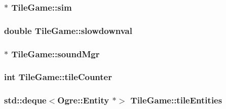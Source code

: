 \hypertarget{classTileGame_a2225cb84303358e59c6093b8a999e085}{
\subsubsection[{sim}]{$\ast$ Tile\-Game\-::sim\hspace{0.3cm}{\ttfamily [protected]}}}\label{classTileGame_a2225cb84303358e59c6093b8a999e085}
\hypertarget{classTileGame_a8b95ee0f509c6e7b170f392d755d2e59}{
\subsubsection[{slowdownval}]{\setlength{\rightskip}{0pt plus 5cm}double Tile\-Game\-::slowdownval\hspace{0.3cm}{\ttfamily [protected]}}}\label{classTileGame_a8b95ee0f509c6e7b170f392d755d2e59}
\hypertarget{classTileGame_aca4c76a09f77a7f55ae0c4396f72aefc}{
\subsubsection[{sound\-Mgr}]{$\ast$ Tile\-Game\-::sound\-Mgr\hspace{0.3cm}{\ttfamily [protected]}}}\label{classTileGame_aca4c76a09f77a7f55ae0c4396f72aefc}
\hypertarget{classTileGame_a0a94db2f1d3da7a330e415d48c18e763}{
\subsubsection[{tile\-Counter}]{\setlength{\rightskip}{0pt plus 5cm}int Tile\-Game\-::tile\-Counter\hspace{0.3cm}{\ttfamily [protected]}}}\label{classTileGame_a0a94db2f1d3da7a330e415d48c18e763}
\hypertarget{classTileGame_aad2a30c885c91193d0a6da18f1477de5}{
\subsubsection[{tile\-Entities}]{\setlength{\rightskip}{0pt plus 5cm}std\-::deque$<$Ogre\-::\-Entity $\ast$$>$ Tile\-Game\-::tile\-Entities\hspace{0.3cm}{\ttfamily [protected]}}}\label{classTileGame_aad2a30c885c91193d0a6da18f1477de5}
